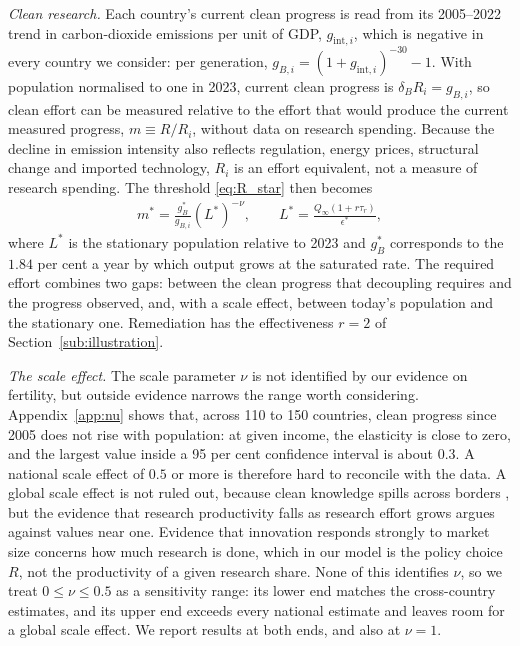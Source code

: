 \documentclass[11pt]{article}
\begin{document}
\emph{Clean research.} Each country's current clean progress is read from its 2005--2022 trend in
carbon-dioxide emissions per unit of GDP, $g_{\text{int},i}$, which is negative in every country we
consider: per generation, $g_{B,i}=(1+g_{\text{int},i})^{-30}-1$. With population normalised to one in
2023, current clean progress is $\delta_BR_i=g_{B,i}$, so clean effort can be measured relative to the
effort that would produce the current measured progress, $m\equiv R/R_i$, without data on research
spending. Because the decline in emission intensity also reflects regulation, energy prices, structural
change and imported technology, $R_i$ is an effort equivalent, not a measure of research spending. The threshold \eqref{eq:R_star} then
becomes
\begin{align}
m^\ast=\frac{g_B^\ast}{g_{B,i}}\left(L^\ast\right)^{-\nu},
\qquad
L^\ast=\frac{Q_\infty(1+r\tau_r)}{\epsilon^\ast},
\label{eq:m_star}
\end{align}
where $L^\ast$ is the stationary population relative to 2023 and $g_B^\ast$ corresponds to the $1.84$ per
cent a year by which output grows at the saturated rate. The required effort combines two gaps: between
the clean progress that decoupling requires and the progress observed, and, with a scale effect, between
today's population and the stationary one. Remediation has the effectiveness $r=2$ of
Section~\ref{sub:illustration}.

\emph{The scale effect.} The scale parameter $\nu$ is not identified by our evidence on fertility, but
outside evidence narrows the range worth considering. Appendix~\ref{app:nu} shows that, across 110 to 150 countries, clean progress
since 2005 does not rise with population: at given income, the elasticity is close to zero, and the
largest value inside a 95 per cent confidence interval is about $0.3$. A national scale effect of $0.5$ or more is therefore hard to reconcile with the data.  A global scale effect is not ruled out, because
clean knowledge spills across borders \citep{aghion2016carbon}, but the evidence that research
productivity falls as research effort grows \citep{jones1995,bloom2020} argues against values near one.
Evidence that innovation responds strongly to market size \citep{acemoglulinn2004} concerns how much
research is done, which in our model is the policy choice $R$, not the productivity of a given research
share. None of this identifies $\nu$, so we treat $0\le\nu\le0.5$ as a sensitivity range: its lower end matches
the cross-country estimates, and its upper end exceeds every national estimate and leaves room for a
global scale effect. We report results at both ends, and also at $\nu=1$.
\end{document}

